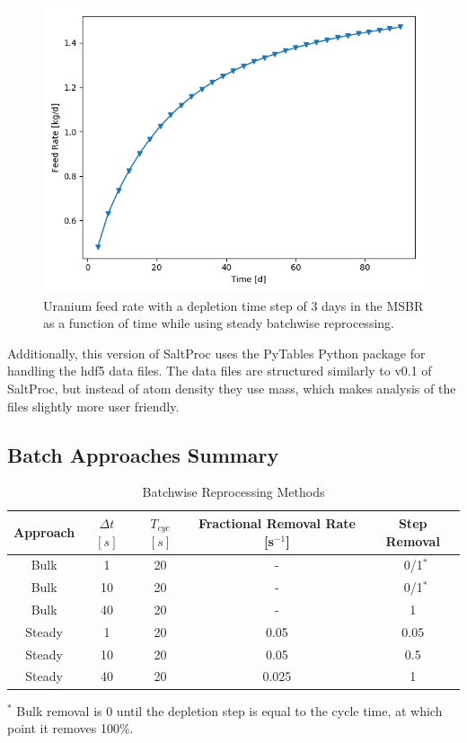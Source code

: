 \begin{figure}[H]
  \centering
  \includegraphics[scale=0.5]{images/feed_U233_3d_90d.png}
  \caption{Uranium feed rate with a depletion time step of 3 days in the MSBR as a function of time while using steady batchwise reprocessing.}
   \label{fig:U-feed-v3}
\end{figure}

Additionally, this version of SaltProc uses the PyTables Python package for handling the hdf5 data files. The data files are structured similarly to v0.1 of SaltProc, but instead of atom density they use mass, which makes analysis of the files slightly more user friendly.

\subsection{Batch Approaches Summary}

\begin{table}[H]
\renewcommand{\arraystretch}{1.25}
\caption{Batchwise Reprocessing Methods}
\label{tab:batch_methods}
\begin{center}
\begin{tabular}{ | c | c | c | c | c | }
 \hline
        Approach & $\Delta t$ $[s]$ & $T_{cyc}$ $[s]$ & Fractional Removal Rate [s$^{-1}$] & Step Removal\\
 \hline
 \hline
        Bulk & 1 & 20 & - & \, 0/1$^{*}$\\
        Bulk & 10 & 20 & - & \, 0/1$^{*}$ \\
        Bulk & 40 & 20 & - & 1 \\
        Steady & 1 & 20 & 0.05 & 0.05\\
        Steady & 10 & 20 & 0.05 & 0.5\\
        Steady & 40 & 20 & 0.025 & 1\\
 \hline
\end{tabular}
\end{center}
\end{table}
        \begin{center}
\footnotesize{$^{*}$ Bulk removal is 0 until the depletion step is equal to the cycle time, at which point it removes 100\%.}\\
        \end{center}
        
